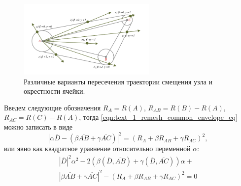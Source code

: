 \begin{figure}[ht]
\centering
\includegraphics[width=0.6\textwidth]{fig/3dr_triangle2.pdf}
\singlespacing
{}\caption{Различные варианты пересечения траектории смещения узла и окрестности ячейки.}
\label{fig:text_1_remesh_common_envelope_2}
\end{figure}

Введем следующие обозначения $R_A = R(A)$, $R_{AB} = R(B) - R(A)$, $R_{AC} = R(C) - R(A)$, тогда \eqref{eqn:text_1_remesh_common_envelope_eq} можно записать в виде
\begin{equation}
	|\alpha \overline{D} - (\beta \overline{AB} + \gamma \overline{AC})|^2 = (R_A + \beta R_{AB} + \gamma R_{AC})^2,
\end{equation}
или явно как квадратное уравнение относительно переменной $\alpha$:
\begin{multline}
	|\overline{D}|^2 \alpha^2 - 2(\beta (\overline{D}, \overline{AB}) + \gamma (\overline{D}, \overline{AC})) \alpha + \\
	|\beta \overline{AB} + \gamma \overline{AC}|^2 - (R_A + \beta R_{AB} + \gamma R_{AC})^2 = 0
\end{multline}

